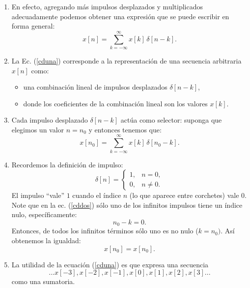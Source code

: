 \documentclass[11pt,a4paper,openany]{book}
\begin{document}
\begin{enumerate}
	\item En efecto, agregando más impulsos desplazados y
	multiplicados adecuadamente podemos obtener una expresión que se
	puede escribir en forma general:
	\begin{equation}
		x[n] = \sum_{k=-\infty}^{\infty} x[k] \, \delta[n-k] .
		\label{cduna}
	\end{equation}
	
	\item La Ec. (\ref{cduna}) corresponde a la representación de una
	secuencia arbitraria $x[n]$ como:
	\begin{itemize}
		\item una combinación lineal de impulsos desplazados $\delta[n-k]$,
		\item donde los coeficientes de la combinación lineal son los valores $x[k]$.
	\end{itemize}
	
	\item Cada impulso desplazado $\delta[n-k]$ actúa
	como selector: suponga que elegimos un valor $n=n_{0}$ y entonces
	tenemos que:
	\begin{equation}
		x[n_{0}] = \sum_{k=-\infty}^{\infty} x[k] \, \delta[n_{0}-k] .
		\label{cddos}
	\end{equation}
	
	\item Recordemos la definición de impulso:
	\begin{equation}
		\delta[n] = 
		\begin{cases}
			1, & n = 0, \\ 
			0, & n \neq 0.
		\end{cases}
	\end{equation}
	El impulso ``vale'' $1$ cuando el índice $n$ (lo que aparece
	entre corchetes) vale $0$. Note que en la ec. (\ref{cddos}) sólo
	uno de los infinitos impulsos tiene un índice nulo,
	específicamente:
	\begin{equation}
		n_{0}-k=0.
	\end{equation}
	Entonces, de todos los infinitos términos sólo uno es no
	nulo ($k=n_{0})$. Así obtenemos la igualdad:
	\begin{equation}
		x[n_{0}] = x[n_{0}] .
	\end{equation}
	
	\item La utilidad de la ecuación (\ref{cduna}) es que expresa una secuencia
	\begin{equation}
		...x[-3], x[-2], x[-1], x[0], x[1], x[2], x[3]...
	\end{equation}
	como una sumatoria.
\end{enumerate}
\end{document}
